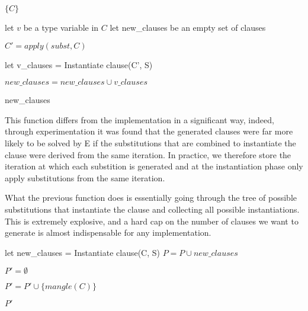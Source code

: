 \documentclass[]{ceurart}
\begin{document}
\begin{algorithm}[tbh]
\begin{algorithmic}[1]


      \State \Return \(\{C\}\)

   \Else

      \State let \(v\) be a type variable in \(C\)
      \State let new\_clauses be an empty set of clauses



            \State \(C' = apply(subst, C)\)

            \State let v\_clauses = Instantiate clause(C', S)

         \EndIf

         \State \( new\_clauses = new\_clauses \cup v\_clauses\)

      \EndFor

      \State \Return new\_clauses
   \EndIf

\EndFunction
\end{algorithmic}
\end{algorithm}
This function differs from the implementation in a significant way, indeed, through experimentation it was found that the generated clauses were far more likely to be solved by E if the substitutions that are combined to instantiate the clause were derived from the same iteration. In practice, we therefore store the iteration at which each substition is generated and at the instantiation phase only apply substitutions from the same iteration.


What the previous function does is essentially going through the tree of possible substitutions that instantiate the clause and collecting all possible instantiations. This is extremely explosive, and a hard cap on the number of clauses we want to generate is almost indispensable for any implementation.

\begin{algorithm}[tbh]
\begin{algorithmic}[1]

   \State let new\_clauses = Instantiate clause(C, S)
   \State \(P = P \cup new\_clauses\)
\EndFor

\State \(P' = \emptyset \)

      \State \(P' = P' \cup \{mangle(C)\}\)
   \EndIf
\EndFor

\State \Return \(P'\)

\EndFunction
\end{algorithmic}
\end{algorithm}
\end{document}
